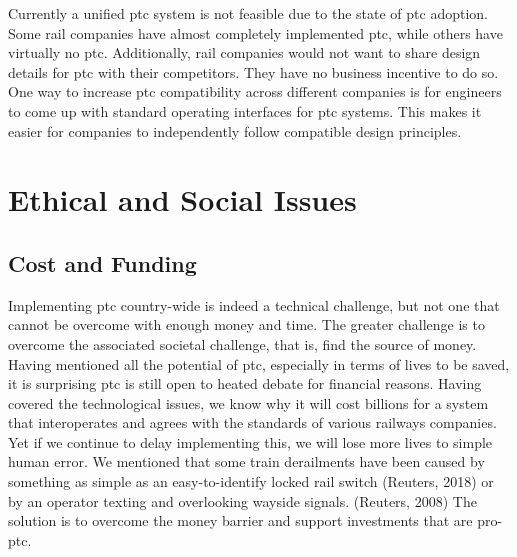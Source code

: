 \documentclass[11pt, titlepage]{article}
\begin{document}
Currently a unified \gls{ptc} system is not feasible due to the state of \gls{ptc}
adoption. Some rail companies have almost completely implemented \gls{ptc}, while
others have virtually no \gls{ptc}. Additionally, rail companies would not want to
share design details for \gls{ptc} with their competitors. They have no business
incentive to do so. One way to increase \gls{ptc} compatibility across different
companies is for engineers to come up with standard operating interfaces for
\gls{ptc} systems. This makes it easier for companies to independently follow
compatible design principles.

\pagebreak

\section{Ethical and Social Issues}

\subsection{Cost and Funding}

Implementing \gls{ptc} country-wide is indeed a technical challenge, but not one
that cannot be overcome with enough money and time. The greater challenge is to
overcome the associated societal challenge, that is, find the source of money.
Having mentioned all the potential of \gls{ptc}, especially in terms of lives to
be saved, it is surprising \gls{ptc} is still open to heated debate for financial
reasons. Having covered the technological issues, we know why it will cost
billions for a system that interoperates and agrees with the standards of various
railways companies. Yet if we continue to delay implementing this, we will lose
more lives to simple human error. We mentioned that some train derailments have
been caused by something as simple as an easy-to-identify locked rail switch
(Reuters, 2018) or by an operator texting and overlooking wayside signals.
(Reuters, 2008) The solution is to overcome the money barrier and support
investments that are pro-\gls{ptc}.
\end{document}
